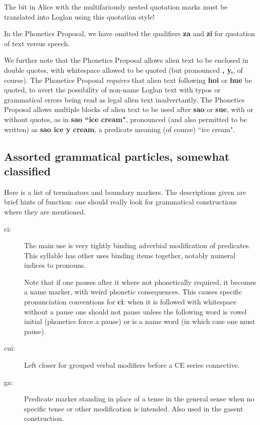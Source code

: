 \documentclass[12pt]{book}
\begin{document}
{The bit in Alice with the multifariously nested quotation marks must be translated into Loglan using this quotation style!

In the Phonetics Proposal, we have omitted the qualifiers {\bf za} and {\bf zi} for quotation of text versus speech.

We further note that the Phonetics Proposal allows alien text to be enclosed in double quotes, with whitespace allowed to be quoted
(but pronounced {\bf, y,}, of course).  The Phonetics Proposal {\em requires\/} that alien text following {\bf hoi} or {\bf hue} be quoted, to avert the possibility of non-name Loglan text with typos or grammatical errors being read as legal alien text inadvertantly.  The Phonetics Proposal allows multiple blocks of alien text to be used after {\bf sao} or {\bf sue}, with or without quotes, as in {\bf sao ``ice cream"}, pronounced (and also permitted to be written)
as {\bf sao ice y cream}, a predicate meaning (of course) ``ice cream".

\subsection{Assorted grammatical particles, somewhat classified}

Here is a list of terminators and boundary markers.  The descriptions given are brief hints of function:  one should really look for grammatical constructions where they are mentioned.

\begin{description}
\item [ci:]  The main use is very tightly binding adverbial modification of predicates.  This syllable has other uses binding items together, notably numeral indices to pronouns.

Note that if one pauses after it where not phonetically required, it becomes a name marker, with weird phonetic consequences.  This causes specific pronunciation conventions for {\bf ci}:  when it is followed with whitespace without a pause one should not pause unless the following word is vowel initial (phonetics force a pause) or is a name word (in which case one must pause).

 \item[cui:]  Left closer for grouped verbal modifiers before a CE series connective.

\item[ga:]   Predicate marker standing in place of a tense in the general sense when no specific tense or other modification is intended.  Also used in the gasent construction.


\end{description}}
\end{document}
